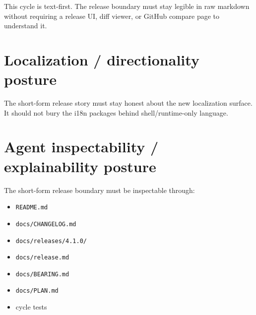 This cycle is text-first. The release boundary must stay legible in raw markdown without requiring a release UI, diff viewer, or GitHub compare page to understand it.

\section{Localization / directionality posture}\label{record-204-localization-directionality-posture}

The short-form release story must stay honest about the new localization surface. It should not bury the i18n packages behind shell/runtime-only language.

\section{Agent inspectability / explainability posture}\label{record-204-agent-inspectability-explainability-posture}

The short-form release boundary must be inspectable through:

\begin{itemize}
\tightlist
\item
  \texttt{R\allowbreak{}E\allowbreak{}A\allowbreak{}D\allowbreak{}M\allowbreak{}E\allowbreak{}.\allowbreak{}m\allowbreak{}d}
\item
  \texttt{d\allowbreak{}o\allowbreak{}c\allowbreak{}s\allowbreak{}/\allowbreak{}C\allowbreak{}H\allowbreak{}A\allowbreak{}N\allowbreak{}G\allowbreak{}E\allowbreak{}L\allowbreak{}O\allowbreak{}G\allowbreak{}.\allowbreak{}m\allowbreak{}d}
\item
  \texttt{d\allowbreak{}o\allowbreak{}c\allowbreak{}s\allowbreak{}/\allowbreak{}r\allowbreak{}e\allowbreak{}l\allowbreak{}e\allowbreak{}a\allowbreak{}s\allowbreak{}e\allowbreak{}s\allowbreak{}/\allowbreak{}4\allowbreak{}.\allowbreak{}1\allowbreak{}.\allowbreak{}0\allowbreak{}/}
\item
  \texttt{d\allowbreak{}o\allowbreak{}c\allowbreak{}s\allowbreak{}/\allowbreak{}r\allowbreak{}e\allowbreak{}l\allowbreak{}e\allowbreak{}a\allowbreak{}s\allowbreak{}e\allowbreak{}.\allowbreak{}m\allowbreak{}d}
\item
  \texttt{d\allowbreak{}o\allowbreak{}c\allowbreak{}s\allowbreak{}/\allowbreak{}B\allowbreak{}E\allowbreak{}A\allowbreak{}R\allowbreak{}I\allowbreak{}N\allowbreak{}G\allowbreak{}.\allowbreak{}m\allowbreak{}d}
\item
  \texttt{d\allowbreak{}o\allowbreak{}c\allowbreak{}s\allowbreak{}/\allowbreak{}P\allowbreak{}L\allowbreak{}A\allowbreak{}N\allowbreak{}.\allowbreak{}m\allowbreak{}d}
\item
  cycle tests
\end{itemize}

